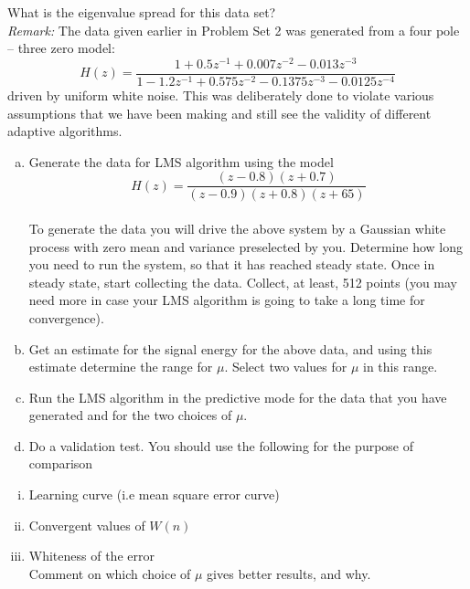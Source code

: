 \documentclass[journal,12pt,twocolumn]{IEEEtran}
\begin{document}
\begin{enumerate}
What is the eigenvalue spread for this data set?\\
\textit{Remark:}
The data given earlier in Problem Set 2 was generated from a four pole – three zero model:\\
$$H(z)= \frac{1+{0.5z^{-1}}+0.007z^{-2}-0.013z^{-3}}{1-1.2z^{-1}+0.575z^{-2}-0.1375z^{-3}-0.0125z^{-4}}$$
driven by uniform white noise. This was deliberately done to violate various assumptions that we have been making and still see the validity of different adaptive algorithms.
\medskip
\begin{enumerate}[(a)]
\item Generate the data for LMS algorithm using the model\\
$$H(z)= \frac{(z-0.8)(z+0.7)}{(z-0.9)(z+0.8)(z+65)}$$\\
\bigskip
To generate the data you will drive the above system by a Gaussian white process with zero mean and variance preselected by you. Determine how long you need to run the system, so that it has reached steady state. Once in steady state, start collecting the data. Collect, at least, 512 points (you may need more in case your LMS algorithm is going to take a long time for convergence).
\smallskip
\item Get an estimate for the signal energy for the above data, and using this estimate determine the range for $\mu.$ 
Select two values for $\mu$ in this range.
\item Run the LMS algorithm in the predictive mode for the data that you have generated and for the two choices of $\mu.$
\item Do a validation test. You should use the following for the purpose of comparison
\end{enumerate}
\begin{enumerate}[i.]
\item Learning curve (i.e mean square error curve)\\
\item Convergent values of $W(n)$\\
\item Whiteness of the error\\
Comment on which choice of $\mu$ gives better results, and why.
\end{enumerate}
\end{enumerate}
\end{document}
